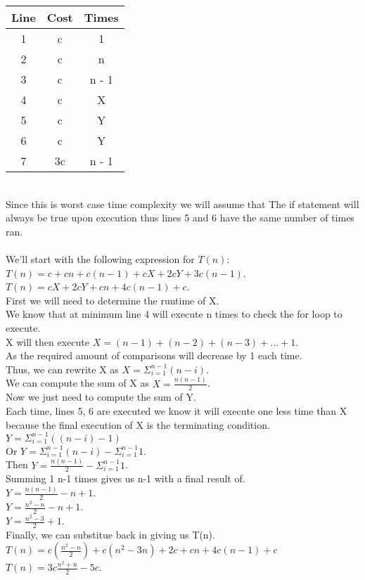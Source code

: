 \documentclass{article}
\begin{document}
\begin{tabular}{|c|c|c|}
    \hline
    Line & Cost & Times\\
    \hline
    1 & c & 1\\
    2 & c & n\\
    3 & c & n - 1\\
    4 & c & X\\
    5 & c & Y\\
    6 & c & Y\\
    7 & 3c & n - 1\\
    \hline
\end{tabular}\\
Since this is worst case time complexity we will assume that 
The if statement will always be true upon execution thus 
lines 5 and 6 have the same number of times ran.\\\\
We'll start with the following expression for $T(n):$\\
$T(n) = c + cn + c(n - 1) + cX + 2cY + 3c(n-1)$.\\
$T(n) = cX + 2cY + cn + 4c(n - 1) + c$.\\
First we will need to determine the runtime of X.\\
We know that at minimum line 4 will execute n times to 
check the for loop to execute.\\
X will then execute $X = (n - 1) + (n - 2) + (n - 3) + ... + 1$.\\
As the required amount of comparisons will decrease by 1 each time.\\
Thus, we can rewrite X as $X = \Sigma^{n - 1}_{i = 1} (n - i)$.\\
We can compute the sum of X as $X = \frac{n(n - 1)}{2}$.\\
Now we just need to compute the sum of Y.\\
Each time, lines 5, 6 are executed we know it will 
execute one less time than X because the final execution 
of X is the terminating condition.\\
$Y = \Sigma^{n - 1}_{i = 1} ((n - i) - 1)$\\
Or $Y = \Sigma^{n - 1}_{i = 1} (n - i) - \Sigma^{n - 1}_{i = 1} 1$.\\
Then $Y = \frac{n(n - 1)}{2} - \Sigma^{n - 1}_{i = 1} 1$.\\
Summing 1 n-1 times gives us n-1 with a final result of.\\
$Y = \frac{n(n - 1)}{2} - n + 1$.\\
$Y = \frac{n^{2} - n}{2} - n + 1$.\\
$Y = \frac{n^{2} - 3}{2} + 1$.\\
Finally, we can substitue back in giving us T(n).\\
$T(n) = c(\frac{n^{2} - n}{2}) + c(n^{2} - 3n) + 2c + cn + 4c(n - 1) + c$\\
$T(n) = 3c\frac{n^{2} + n}{2} - 5c$.\\
\end{document}
